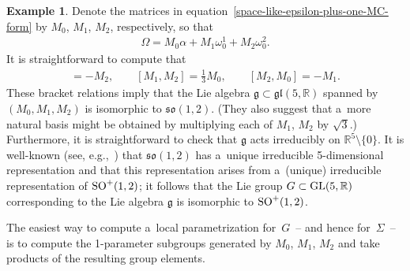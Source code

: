 \documentclass[10pt,a4paper]{amsart}
\numberwithin{equation}{section}
\theoremstyle{definition}
\newtheorem{exmpl}[teo]{Example}
\begin{document}
\begin{exmpl}
Denote the matrices in equation~\eqref{space-like-epsilon-plus-one-MC-form} by $M_0$, $M_1$, $M_2$, respectively, so that
\begin{gather*}
\Omega = M_0  \alpha + M_1  \omega^1_0 + M_2  \omega^2_0.
\end{gather*}
It is straightforward to compute that
\begin{gather*}
[M_0, M_1] = -M_2,
\qquad
[M_1, M_2] = \tfrac{1}{3} M_0,
\qquad
[M_2, M_0] = -M_1.
\end{gather*}
These bracket relations imply that the Lie algebra $\mathfrak{g} \subset \mathfrak{gl}(5,\mathbb{R})$ spanned by $(M_0,
M_1, M_2)$ is isomorphic to $\mathfrak{so}(1,2)$.
(They also suggest that a~more natural basis might be obtained by multiplying each of $M_1$, $M_2$ by $\sqrt{3}$.)
Furthermore, it is straightforward to check that $\mathfrak{g}$ acts irreducibly on $\mathbb{R}^5 \setminus \{0 \}$.
It is well-known (see, e.g.,~\cite[p.~149]{FultonHarris}) that $\mathfrak{so}(1,2)$ has a~unique irreducible
5-dimensional representation and that this representation arises from a~(unique) irreducible representation of ${\rm
SO}^+(1,2)$; it follows that the Lie group $G \subset {\rm GL}(5,\mathbb{R})$ corresponding to the Lie algebra
$\mathfrak{g}$ is isomorphic to ${\rm SO}^+(1,2)$.

The easiest way to compute a~local parametrization for~$G$~-- and hence for~$\Sigma$~-- is to compute the 1-parameter
subgroups generated by $M_0$, $M_1$, $M_2$ and take products of the resulting group elements.


\end{exmpl}
\end{document}
